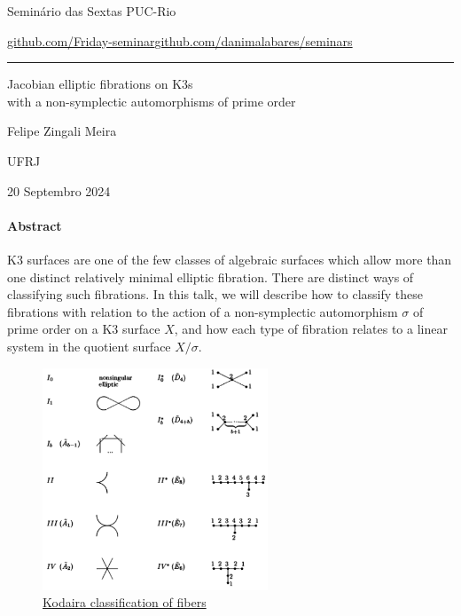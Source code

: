 


\begin{minipage}{\textwidth}
	\begin{minipage}{1\textwidth}
		Semin\'ario das Sextas \hfill PUC-Rio
		
		{\small\href{https://github.com/Friday-seminar/}{github.com/Friday-seminar}\hfill\href{https://github.com/danimalabares/seminars}{github.com/danimalabares/seminars}}
		\end{minipage}
\end{minipage}\vspace{.2cm}\hrule

\vspace{10pt}

{\Huge Jacobian elliptic fibrations on K3s \\with a non-symplectic automorphisms of prime order}

\hfill{\Large Felipe Zingali Meira}

\hfill{\Large UFRJ}

\hfill{\large 20 Septembro 2024}

\paragraph{Abstract} K3 surfaces are one of the few classes of algebraic surfaces which allow more than one distinct relatively minimal elliptic fibration. There are distinct ways of classifying such fibrations. In this talk, we will describe how to classify these fibrations with relation to the action of a non-symplectic automorphism $\sigma$ of prime order on a K3 surface $X$, and how each type of fibration relates to a linear system in the quotient surface $X/\sigma$.

\tableofcontents

\begin{figure}[H]
	\centering
	\includegraphics[width=0.6\textwidth]{fig1.png}
	\caption*{\href{https://www.math.columbia.edu/~chaoli/docs/EllipticSurfaces.html}{Kodaira classification of fibers}}
\end{figure}

